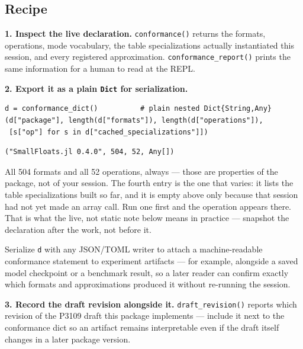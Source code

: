 \subsection{Recipe}



\label{111379208343275940-dup4}{}


\textbf{1. Inspect the live declaration.} \texttt{conformance()} returns the formats, operations, mode vocabulary, the table specializations actually instantiated this session, and every registered approximation. \texttt{conformance\_\allowbreak{}report()} prints the same information for a human to read at the REPL.



\textbf{2. Export it as a plain \texttt{Dict} for serialization.}




\begin{minipage}{\linewidth}
\begin{verbatim}
d = conformance_dict()          # plain nested Dict{String,Any}
(d["package"], length(d["formats"]), length(d["operations"]),
 [s["op"] for s in d["cached_specializations"]])
\end{verbatim}




\begin{verbatim}
("SmallFloats.jl 0.4.0", 504, 52, Any[])
\end{verbatim}
\end{minipage}




All 504 formats and all 52 operations, always — those are properties of the package, not of your session. The fourth entry is the one that varies: it lists the table specializations built so far, and it is empty above only because that session had not yet made an array call. Run one first and the operation appears there. That is what the {\textquotedbl}live, not static{\textquotedbl} note below means in practice — snapshot the declaration after the work, not before it.



Serialize \texttt{d} with any JSON/TOML writer to attach a machine-readable conformance statement to experiment artifacts — for example, alongside a saved model checkpoint or a benchmark result, so a later reader can confirm exactly which formats and approximations produced it without re-running the session.



\textbf{3. Record the draft revision alongside it.} \texttt{draft\_\allowbreak{}revision()} reports which revision of the P3109 draft this package implements — include it next to the conformance dict so an artifact remains interpretable even if the draft itself changes in a later package version.



